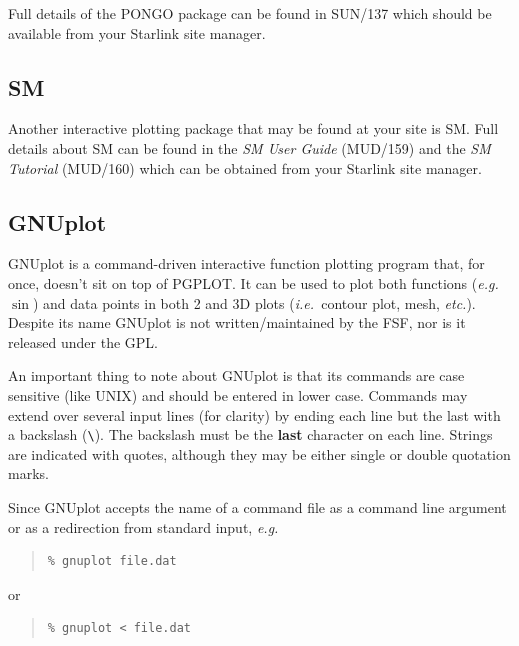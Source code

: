 \documentclass[twoside,11pt]{article}
\newcommand{\htmladdnormallink}[2]{#1}
\newcommand{\htmlref}[2]{#1}
\newcommand{\xref}[3]{#1}
\newcommand{\xlabel}[1]{}
\begin{document}
Full details of the PONGO package can be found in \xref{SUN/137}{sun137}{} which should be available from your Starlink site manager.
 
\subsection{\xlabel{sc15_sm}SM\label{sc15_sm}}

Another interactive plotting package that may be found at your site is SM. Full details about SM can be found in the {\em SM User Guide} (MUD/159) and the {\em SM Tutorial} (MUD/160) which can be obtained from your Starlink site manager.

\subsection{\xlabel{sc15_gnuplot}GNUplot\label{sc15_gnuplot}}

\htmladdnormallink{GNUplot}{http://www.cs.dartmouth.edu/gnuplot_info.html} is a command-driven interactive function plotting program that, for once, doesn't sit on top of \htmlref{PGPLOT}{sc15_pgplot}. It can be used to plot both functions ({\em e.g.\ }$\sin$) and data points in both 2 and 3D plots ({\em i.e.\ }contour plot, mesh, {\em etc.}). Despite its name GNUplot is not written/maintained by the FSF, nor is it released under the GPL.

An important thing to note about GNUplot is that its commands are case sensitive (like UNIX) and should be entered in lower case. Commands may extend over several input lines (for clarity)  by ending each line but the last with a backslash (\verb+\+). The backslash must be the {\bf last} character on
each line. Strings are indicated with quotes, although they may be either single or double quotation marks.

Since GNUplot accepts the name of a command file as a command line argument or as a redirection from standard input, {\em e.g.\ }

\small
\begin{quote}
\begin{verbatim}
% gnuplot file.dat
\end{verbatim}
\end{quote}
\normalsize

or

\small
\begin{quote}
\begin{verbatim}
% gnuplot < file.dat
\end{verbatim}
\end{quote}
\normalsize
\end{document}
